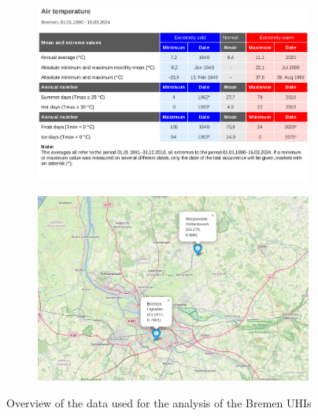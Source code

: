 \documentclass[12pt,a4paper, english,twoside]{article}
\begin{document}
      \begin{figure}[!p]
         \centering
           \begin{subfigure}[b]{\textwidth}
             \includegraphics[width=\textwidth]{img/DWDBremenWeather.jpg}
           \end{subfigure}
    
           \begin{subfigure}[b]{\textwidth}
            \includegraphics[width=\textwidth]{img/MapWetterstationenBremen.jpeg}
             \label{fig:mapWeatherstationsBremen}
           \end{subfigure}
             \caption{Overview of the data used for the analysis of the Bremen \glspl{UHI}}\label{fig:AnalysisBre}
      \end{figure}
\end{document}
